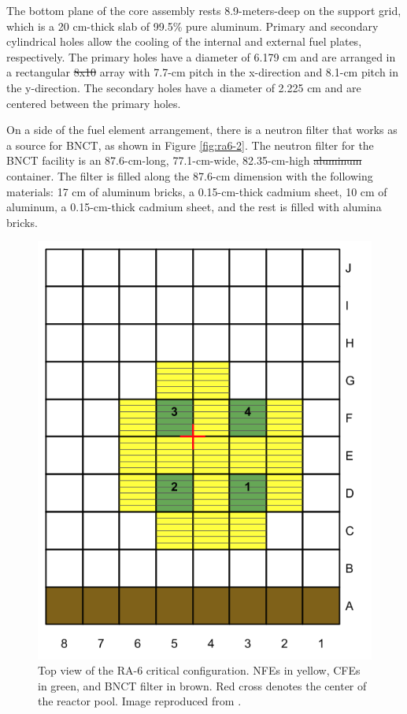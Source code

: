 \documentclass{style/nseJournal}
\providecommand{\DIFadd}[1]{{\protect\color{blue}\uwave{#1}}} %
\providecommand{\DIFdel}[1]{{\protect\color{red}\sout{#1}}}                      %
\providecommand{\DIFaddbegin}{} %
\providecommand{\DIFaddend}{} %
\providecommand{\DIFdelbegin}{} %
\providecommand{\DIFdelend}{} %
\begin{document}
The bottom plane of the core assembly rests 8.9-meters-deep on the support grid, which is a 20 cm-thick slab of 99.5\% pure aluminum.
Primary and secondary cylindrical holes allow the cooling of the internal and external fuel plates, respectively.
The primary holes have a diameter of 6.179 cm and are arranged in a rectangular \DIFdelbegin \DIFdel{8x10 }\DIFdelend \DIFaddbegin \DIFadd{8 x 10 }\DIFaddend array with 7.7-cm pitch in the x-direction and 8.1-cm pitch in the y-direction.
The secondary holes have a diameter of 2.225 cm and are centered between the primary holes.

On a side of the fuel element arrangement, there is a neutron filter that works as a source for \gls*{BNCT}, as shown in Figure \ref{fig:ra6-2}.
The neutron filter for the \gls*{BNCT} facility is an 87.6-cm-long, 77.1-cm-wide, 82.35-cm-high \DIFdelbegin \DIFdel{aluminum }\DIFdelend container.
The filter is filled along the 87.6-cm dimension with the following materials: 17 cm of aluminum bricks, a 0.15-cm-thick cadmium sheet, 10 cm of aluminum, a 0.15-cm-thick cadmium sheet, and the rest is filled with alumina \DIFaddbegin \DIFadd{(Al$_2$O$_3$) }\DIFaddend bricks.

\begin{figure}[htbp!] %
    \centering
    \includegraphics[width=0.55\linewidth]{figures/ra6_core2}
    \hfill
    \caption{Top view of the RA-6 critical configuration. NFEs in yellow, CFEs in green, and BNCT filter in brown. Red cross denotes the center of the reactor pool. Image reproduced from \cite{ICSBEP}.}
    \label{fig:ra6-1}
\end{figure}
\end{document}
